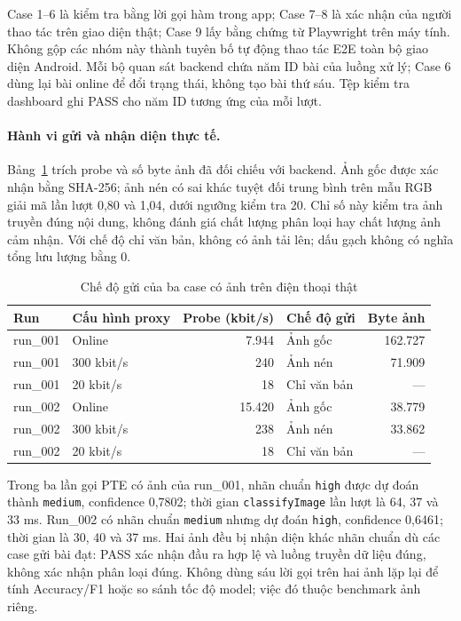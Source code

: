 Case 1--6 là kiểm tra bằng lời gọi hàm trong app; Case 7--8 là xác nhận của người thao tác trên giao diện thật; Case 9 lấy bằng chứng từ Playwright trên máy tính. Không gộp các nhóm này thành tuyên bố tự động thao tác E2E toàn bộ giao diện Android. Mỗi bộ quan sát backend chứa năm ID bài của luồng xử lý; Case 6 dùng lại bài online để đổi trạng thái, không tạo bài thứ sáu. Tệp kiểm tra dashboard ghi PASS cho năm ID tương ứng của mỗi lượt.

\paragraph{Hành vi gửi và nhận diện thực tế.}
Bảng~\ref{tab:mobile-system-network} trích probe và số byte ảnh đã đối chiếu với backend. Ảnh gốc được xác nhận bằng SHA-256; ảnh nén có sai khác tuyệt đối trung bình trên mẫu RGB giải mã lần lượt 0,80 và 1,04, dưới ngưỡng kiểm tra 20. Chỉ số này kiểm tra ảnh truyền đúng nội dung, không đánh giá chất lượng phân loại hay chất lượng ảnh cảm nhận. Với chế độ chỉ văn bản, không có ảnh tải lên; dấu gạch không có nghĩa tổng lưu lượng bằng 0.

\begin{table}[htbp]\centering
\caption{Chế độ gửi của ba case có ảnh trên điện thoại thật}
\label{tab:mobile-system-network}
\begin{tabular}{llrlr}
\toprule Run & Cấu hình proxy & Probe (kbit/s) & Chế độ gửi & Byte ảnh \\
\midrule
run\_001 & Online & 7.944 & Ảnh gốc & 162.727 \\
run\_001 & 300 kbit/s & 240 & Ảnh nén & 71.909 \\
run\_001 & 20 kbit/s & 18 & Chỉ văn bản & --- \\
run\_002 & Online & 15.420 & Ảnh gốc & 38.779 \\
run\_002 & 300 kbit/s & 238 & Ảnh nén & 33.862 \\
run\_002 & 20 kbit/s & 18 & Chỉ văn bản & --- \\
\bottomrule
\end{tabular}
\end{table}
Trong ba lần gọi PTE có ảnh của run\_001, nhãn chuẩn \texttt{high} được dự đoán thành \texttt{medium}, confidence 0,7802; thời gian \texttt{classifyImage} lần lượt là 64, 37 và 33 ms. Run\_002 có nhãn chuẩn \texttt{medium} nhưng dự đoán \texttt{high}, confidence 0,6461; thời gian là 30, 40 và 37 ms. Hai ảnh đều bị nhận diện khác nhãn chuẩn dù các case gửi bài đạt: PASS xác nhận đầu ra hợp lệ và luồng truyền dữ liệu đúng, không xác nhận phân loại đúng. Không dùng sáu lời gọi trên hai ảnh lặp lại để tính Accuracy/F1 hoặc so sánh tốc độ model; việc đó thuộc benchmark ảnh riêng.

